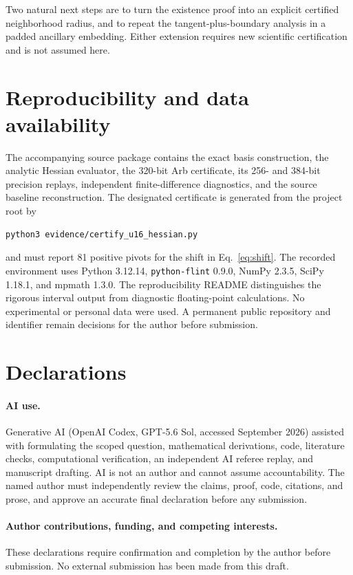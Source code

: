 \documentclass[11pt]{article}
\begin{document}
Two natural next steps are to turn the existence proof into an explicit
certified neighborhood radius, and to repeat the tangent-plus-boundary
analysis in a padded ancillary embedding.  Either extension requires new
scientific certification and is not assumed here.

\section{Reproducibility and data availability}

The accompanying source package contains the exact basis construction, the
analytic Hessian evaluator, the 320-bit Arb certificate, its 256- and 384-bit
precision replays, independent finite-difference diagnostics, and the source
baseline reconstruction.  The designated certificate is generated from the
project root by
\begin{verbatim}
python3 evidence/certify_u16_hessian.py
\end{verbatim}
and must report 81 positive pivots for the shift in
Eq.~\eqref{eq:shift}.  The recorded environment uses Python 3.12.14,
\texttt{python-flint} 0.9.0, NumPy 2.3.5, SciPy 1.18.1, and mpmath 1.3.0.
The reproducibility README distinguishes the rigorous interval output from
diagnostic floating-point calculations.  No experimental or personal data
were used.  A permanent public repository and identifier remain decisions
for the author before submission.

\section*{Declarations}

\paragraph{AI use.}
Generative AI (OpenAI Codex, GPT-5.6 Sol, accessed September 2026) assisted
with formulating the scoped question, mathematical derivations, code,
literature checks, computational verification, an independent AI referee
replay, and manuscript drafting.  AI is not an author and cannot assume
accountability.  The named author must independently review the claims,
proof, code, citations, and prose, and approve an accurate final declaration
before any submission.

\paragraph{Author contributions, funding, and competing interests.}
These declarations require confirmation and completion by the author before
submission.  No external submission has been made from this draft.



\end{document}
